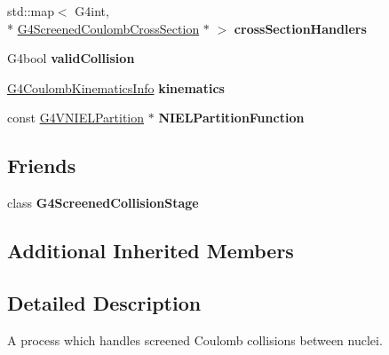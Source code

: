 \begin{DoxyCompactItemize}
\item 
\hypertarget{classG4ScreenedNuclearRecoil_a9860a5abf8c2239adad8d1635612d6a1}{std\-::map$<$ G4int, \\*
\hyperlink{classG4ScreenedCoulombCrossSection}{G4\-Screened\-Coulomb\-Cross\-Section} $\ast$ $>$ {\bfseries cross\-Section\-Handlers}}\label{classG4ScreenedNuclearRecoil_a9860a5abf8c2239adad8d1635612d6a1}

\item 
\hypertarget{classG4ScreenedNuclearRecoil_a995a78de62358db496505ab0f39de0a1}{G4bool {\bfseries valid\-Collision}}\label{classG4ScreenedNuclearRecoil_a995a78de62358db496505ab0f39de0a1}

\item 
\hypertarget{classG4ScreenedNuclearRecoil_ae7539ec7406f555a9655e4da0b78f05b}{\hyperlink{structG4CoulombKinematicsInfo}{G4\-Coulomb\-Kinematics\-Info} {\bfseries kinematics}}\label{classG4ScreenedNuclearRecoil_ae7539ec7406f555a9655e4da0b78f05b}

\item 
\hypertarget{classG4ScreenedNuclearRecoil_a23c8089692df12b1bc82b5402f86dfea}{const \hyperlink{classG4VNIELPartition}{G4\-V\-N\-I\-E\-L\-Partition} $\ast$ {\bfseries N\-I\-E\-L\-Partition\-Function}}\label{classG4ScreenedNuclearRecoil_a23c8089692df12b1bc82b5402f86dfea}

\end{DoxyCompactItemize}
\subsection*{Friends}
\begin{DoxyCompactItemize}
\item 
\hypertarget{classG4ScreenedNuclearRecoil_a13d7049bfd5b31725b6ce577a38eb362}{class {\bfseries G4\-Screened\-Collision\-Stage}}\label{classG4ScreenedNuclearRecoil_a13d7049bfd5b31725b6ce577a38eb362}

\end{DoxyCompactItemize}
\subsection*{Additional Inherited Members}


\subsection{Detailed Description}
A process which handles screened Coulomb collisions between nuclei. 

